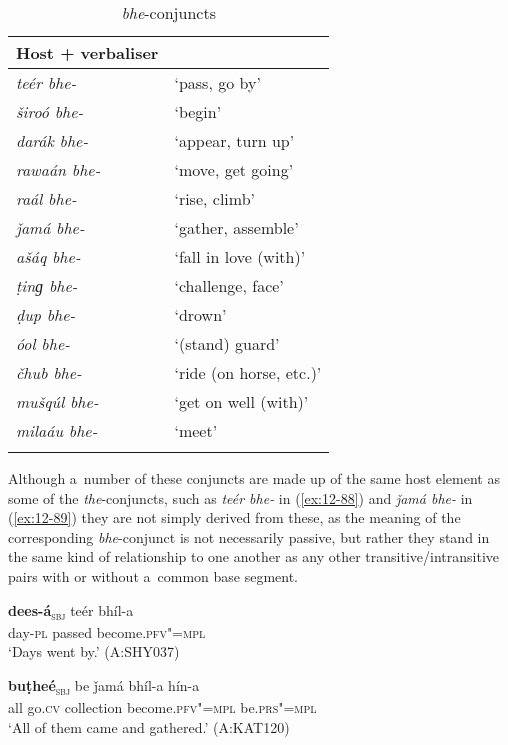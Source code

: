 \begin{table}[ht]
\caption{\textit{bhe}-conjuncts}
\begin{tabularx}{.75\textwidth}{ l@{\hspace{45pt}} Q }
\lsptoprule
Host + verbaliser &
\\\hline
\textit{teér bhe-} &
`pass, go by'\\
\textit{široó bhe-} &
`begin'\\
\textit{darák bhe-} &
`appear, turn up'\\
\textit{rawaán bhe-} &
`move, get going'\\
\textit{raál bhe-} &
`rise, climb'\\
\textit{ǰamá bhe-} &
`gather, assemble'\\
\textit{ašáq bhe-} &
`fall in love (with)'\\
\textit{ṭinɡ bhe-} &
`challenge, face'\\
\textit{ḍup bhe-} &
`drown'\\
\textit{óol bhe-} &
`(stand) guard'\\
\textit{čhub bhe-} &
`ride (on horse, etc.)'\\
\textit{mušqúl bhe-} &
`get on well (with)'\\
\textit{milaáu bhe-} &
`meet'\\\lspbottomrule
\end{tabularx}
\label{tab:12-6}
\end{table}


Although a~number of these conjuncts are made up of the same host element as some of the \textit{the}-conjuncts, such as \textit{teér bhe-} in (\ref{ex:12-88}) and \textit{ǰamá bhe-} in (\ref{ex:12-89}) they are not simply derived from these, as the meaning of the corresponding \textit{bhe}-conjunct is not necessarily passive, but rather they stand in the same kind of relationship to one another as any other transitive/intransitive pairs with or without a~common base segment.

\begin{exe}
\ex
\label{ex:12-88}
\gll {\ob}\textbf{dees-á}{\cb}\textsubscript{\textsc{\upshape sbj}} teér bhíl-a\\
day-\textsc{pl} passed become.\textsc{pfv"=mpl}\\
\glt `Days went by.' (A:SHY037)
\end{exe}
\begin{exe}
\ex
\label{ex:12-89}
\gll {\ob}\textbf{buṭheé}{\cb}\textsubscript{\textsc{\upshape sbj}} be ǰamá bhíl-a hín-a\\
all go.\textsc{cv} collection become.\textsc{pfv"=mpl} be.\textsc{prs"=mpl} \\
\glt `All of them came and gathered.' (A:KAT120)
\end{exe}

